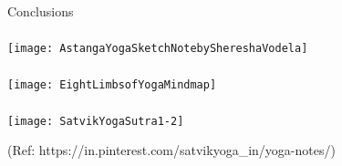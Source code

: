 \begin{frame}[fragile]\frametitle{}
\begin{center}
{\Large Conclusions}
\end{center}
\end{frame}

\begin{frame}[fragile]\frametitle{}

\begin{center}
\texttt{[image: AstangaYogaSketchNotebyShereshaVodela]}
\end{center}

\end{frame}

\begin{frame}[fragile]\frametitle{}

\begin{center}
\texttt{[image: EightLimbsofYogaMindmap]}
\end{center}

\end{frame}

\begin{frame}[fragile]\frametitle{}

\begin{center}
\texttt{[image: SatvikYogaSutra1-2]}

{\tiny (Ref: https://in.pinterest.com/satvikyoga\_in/yoga-notes/)}
\end{center}

\end{frame}